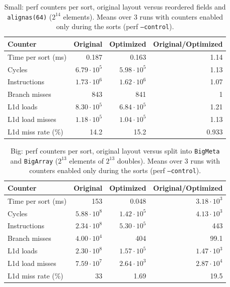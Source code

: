 \begin{table}[htbp]
\centering
\begin{tabular}{lrrr}
\toprule
Counter & Original & Optimized & Original/Optimized \\
\midrule
Time per sort (ms) & 0.187 & 0.163 & 1.14 \\
Cycles & $6.79\cdot10^{5}$ & $5.98\cdot10^{5}$ & 1.13 \\
Instructions & $1.73\cdot10^{6}$ & $1.62\cdot10^{6}$ & 1.07 \\
Branch misses & 843 & 841 & 1 \\
L1d loads & $8.30\cdot10^{5}$ & $6.84\cdot10^{5}$ & 1.21 \\
L1d load misses & $1.18\cdot10^{5}$ & $1.04\cdot10^{5}$ & 1.13 \\
L1d miss rate (\%) & 14.2 & 15.2 & 0.933 \\
\bottomrule
\end{tabular}
\caption{Small: perf counters per sort, original layout versus reordered fields and \texttt{alignas(64)} ($2^{14}$ elements). Means over 3 runs with counters enabled only during the sorts (perf \texttt{--control}).}
\label{tab:perf-small}
\end{table}

\begin{table}[htbp]
\centering
\begin{tabular}{lrrr}
\toprule
Counter & Original & Optimized & Original/Optimized \\
\midrule
Time per sort (ms) & 153 & 0.048 & $3.18\cdot10^{3}$ \\
Cycles & $5.88\cdot10^{8}$ & $1.42\cdot10^{5}$ & $4.13\cdot10^{3}$ \\
Instructions & $2.34\cdot10^{8}$ & $5.30\cdot10^{5}$ & 443 \\
Branch misses & $4.00\cdot10^{4}$ & 404 & 99.1 \\
L1d loads & $2.30\cdot10^{8}$ & $1.57\cdot10^{5}$ & $1.47\cdot10^{3}$ \\
L1d load misses & $7.59\cdot10^{7}$ & $2.64\cdot10^{3}$ & $2.87\cdot10^{4}$ \\
L1d miss rate (\%) & 33 & 1.69 & 19.5 \\
\bottomrule
\end{tabular}
\caption{Big: perf counters per sort, original layout versus split into \texttt{BigMeta} and \texttt{BigArray} ($2^{13}$ elements of $2^{13}$ doubles). Means over 3 runs with counters enabled only during the sorts (perf \texttt{--control}).}
\label{tab:perf-big}
\end{table}
